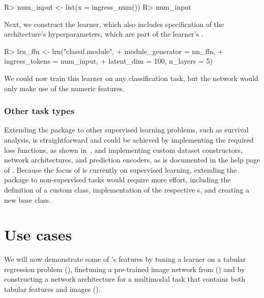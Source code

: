 \documentclass[article]{jss}
\theoremstyle{definition}
\begin{document}
\begin{CodeInput}
R> num_input <- list(x = ingress_num())
R> num_input
\end{CodeInput}


Next, we construct the learner, which also includes specification of the architecture's hyperparameters, which are part of the learner's .

\begin{CodeInput}
R> lrn_ffn <- lrn("classif.module",
+    module_generator = nn_ffn,
+    ingress_tokens = num_input,
+    latent_dim = 100, n_layers = 5)
\end{CodeInput}

We could now train this learner on any \mlrt{} classification task, but the network would only make use of the numeric features.

\subsubsection{Other task types}

Extending the package to other supervised learning problems, such as survival analysis, is straightforward and could be achieved by implementing the required loss functions, as shown in~, and implementing custom dataset constructors, network architectures, and prediction encoders, as is documented in the help page of .
Because the focus of  is currently on supervised learning, extending the package to non-supervised tasks would require more effort, including the definition of a custom  class, implementation of the respective s, and creating a new  base class.

\section{Use cases}\label{sec:use-cases}

We will now demonstrate some of 's features by tuning a \torch{} learner on a tabular regression problem (), finetuning a pre-trained image network from  () and by constructing a network architecture for a multimodal task that contains both tabular features and images ().
\end{document}
